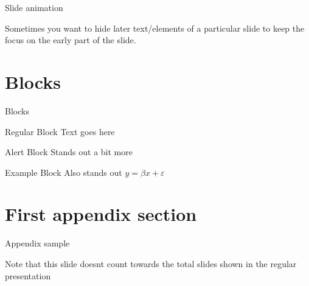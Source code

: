 \documentclass[12pt,aspectratio=43]{beamer} %
\begin{document}
\begin{frame}{Slide animation}

	Sometimes you want to hide later text/elements of a particular slide to keep the focus on the early part of the slide.

	\bigskip


\end{frame}



\section{Blocks}

\begin{frame}{Blocks}

	\begin{block}{Regular Block}
		Text goes here
	\end{block}

	\begin{alertblock}{Alert Block}
		Stands out a bit more
	\end{alertblock}

	\begin{exampleblock}{Example Block}
		Also stands out $y=\beta x+ \varepsilon$
	\end{exampleblock}

\end{frame}



\appendix

{\BackgroundShaded
\begin{frame}
\end{frame}
}



\section{First appendix section}

\begin{frame}{Appendix sample}

	Note that this slide doesnt count towards the total slides shown in the regular presentation

\end{frame}



\end{document}
